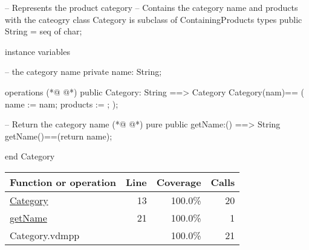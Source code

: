 \begin{vdmpp}[breaklines=true]
-- Represents the product category
-- Contains the category name and products with the cateogry
class Category is subclass of ContainingProducts
 types 
  public String = seq of char;
  
 instance variables
   
   -- the category name
  private name: String;
   
 operations
(*@
\label{Category:13}
@*)
  public Category: String ==> Category
  Category(nam)==
  (
   name := nam;
   products := {};
  );
  
  -- Return the category name
(*@
\label{getName:21}
@*)
  pure public getName:() ==> String
  getName()==(return name);
  
end Category
\end{vdmpp}
\bigskip
\begin{longtable}{|l|r|r|r|}
\hline
Function or operation & Line & Coverage & Calls \\
\hline
\hline
\hyperref[Category:13]{Category} & 13&100.0\% & 20 \\
\hline
\hyperref[getName:21]{getName} & 21&100.0\% & 1 \\
\hline
\hline
Category.vdmpp & & 100.0\% & 21 \\
\hline
\end{longtable}


